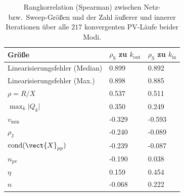 \begin{table}[htbp]
\centering
\caption{Rangkorrelation (Spearman) zwischen Netz- bzw.\ Sweep-Gr\"o\ss en und der Zahl \"au\ss erer und innerer Iterationen \"uber alle $217$ konvergenten PV-L\"aufe beider Modi.}
\label{tab:rx-predictor}
\begin{tabular}{lll}
\toprule
Gr\"o\ss e & $\rho_{\mathrm{S}}$ zu $k_{\mathrm{out}}$ & $\rho_{\mathrm{S}}$ zu $k_{\mathrm{in}}$ \\
\midrule
Linearisierungsfehler (Median) & 0.899 & 0.892 \\
Linearisierungsfehler (Max.) & 0.898 & 0.885 \\
$\rho=R/X$ & 0.537 & 0.511 \\
$\max_k\lvert Q_k\rvert$ & 0.350 & 0.249 \\
$v_{\min}$ & -0.329 & -0.593 \\
$\rho_{\mathrm{J}}$ & -0.240 & -0.089 \\
$\mathrm{cond}(\vect{X}_{pp})$ & -0.239 & -0.087 \\
$n_\mathrm{pv}$ & -0.190 & 0.038 \\
$\eta$ & 0.159 & 0.454 \\
$n$ & -0.068 & 0.222 \\
\bottomrule
\end{tabular}
\end{table}

